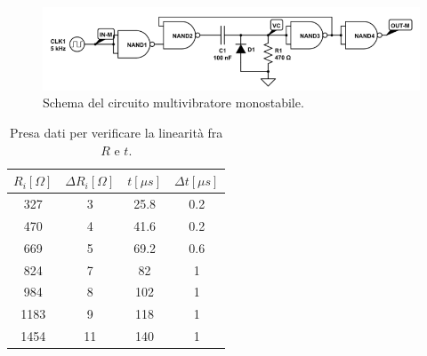 \documentclass[10pt,a4paper]{article}
\begin{document}




\begin{figure}[!htb]
  \centering
  \includegraphics[scale=0.5]{monostabile.png}
\caption{Schema del circuito multivibratore monostabile.\label{fig:monostabile}}
\end{figure}

\begin{table}[!htb]
\centering
\begin{tabular}{|c|c|c|c|}
\hline 
$R_i [\Omega ]$ & $\Delta R_i [\Omega ]$ & $t [\mu s]$ & $\Delta t [\mu s]$\\
\hline
 327 &  3 & 25.8 & 0.2\\ 
\hline 
 470 &  4 & 41.6 & 0.2\\ 
\hline
 669 &  5 & 69.2 & 0.6\\ 
\hline
 824 &  7 & 82 & 1\\ 
\hline 
 984 &  8 & 102 & 1\\ 
\hline
 1183 &  9 & 118 & 1\\ 
\hline
 1454 &  11 & 140 & 1\\ 
\hline
\end{tabular} 
\caption{Presa dati per verificare la linearità fra $R$ e $t$.\label{tab:monostabile}}
\end{table}
\end{document}

